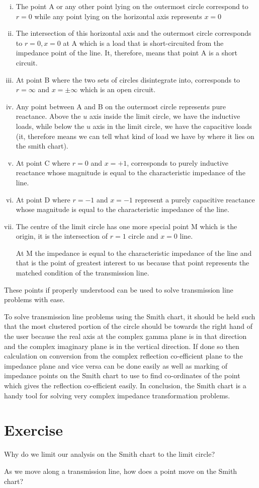 \begin{enumerate}[(i)]
\item The point A or any other point lying on the outermost circle correspond to $r = 0$ while any point lying on the horizontal axis represents $x = 0$

\item The intersection of this horizontal axis and the outermost circle corresponds to $r = 0,x = 0$ at A which is a load that is short-circuited from the impedance point of the line. It, therefore, means that point A is a short circuit.

\item At point B where the two sets of circles disintegrate into, corresponds to $r = \infty$ and $x = \pm\infty $ which is an open circuit.

\item Any point between A and B on the outermost circle represents pure reactance. Above the $u$ axis inside the limit circle, we have the inductive loads, while below the $u$ axis in the limit circle, we have the capacitive loads (it, therefore means we can tell what kind of load we have by where it lies on the smith chart).

\item At point C where $r = 0$ and $x = +1$, corresponds to purely inductive reactance whose magnitude is equal to the characteristic impedance of the line.

\item At point D where $r = -1$ and $x = -1$ represent a purely capacitive reactance whose magnitude is equal to the characteristic impedance of the line.

\item The centre of the limit circle has one more special point M which is the origin, it is the intersection of $r = 1$ circle and $x = 0$ line.

At M the impedance is equal to the characteristic impedance of the line and that is the point of greatest interest to us because that point represents the matched condition of the transmission line.
\end{enumerate}
These points if properly understood can be used to solve transmission line problems with ease.

To solve transmission line problems using the Smith chart, it should be held such that the most clustered portion of the circle should be towards the right hand of the user because the real axis at the complex gamma plane is in that direction and the complex imaginary plane is in the vertical direction. If done so then calculation on conversion from the complex reflection co-efficient plane to the impedance plane and vice versa can be done easily as well as marking of impedance points on the Smith chart to use to find co-ordinates of the point which gives the reflection co-efficient easily. In conclusion, the Smith chart is a handy tool for solving very complex impedance transformation problems.

\section*{Exercise}
\begin{ExerciseList}
\Exercise[label={ex71}]
Why do we limit our analysis on the Smith chart to the limit circle?

\Exercise[label={ex72}]
As we move along a transmission line, how does a point move on the Smith chart?
\end{ExerciseList}